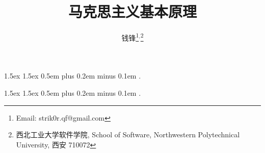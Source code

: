 \documentclass[11pt, UTF8]{book} %
\title{\textbf{马克思主义基本原理}}
\author{钱锋\thanks{Email: strik0r.qf@gmail.com}${}^,$\thanks{
    西北工业大学软件学院, School of Software, Northwestern Polytechnical University, 西安 710072
}}
\begin{document}
    {1.5ex}                                         %
    {1.5ex}                                         %
    {}                                              %
    {}                                              %
    {\bfseries}                                     %
    {}                                              %
    {0.5em plus 0.2em minus 0.1em}                  %
    {.}

\theoremstyle{mytheoremstyle} \newtheorem{example}{例}[section]
\theoremstyle{mytheoremstyle} \newtheorem{key}{核心要点}[section]

\theoremstyle{plain} \newtheorem{thm}{分析论述}

    {1.5ex}                                         %
    {1.5ex}                                         %
    {}                                              %
    {}                                              %
    {\kaishu}                                       %
    {}                                              %
    {0.5em plus 0.2em minus 0.1em}                  %
    {.}

\theoremstyle{my3theoremstyle}
\newtheorem*{remark}{注}
\newtheorem*{sol}{答案要点}
\newtheorem*{cmt}{评注}
\end{document}

